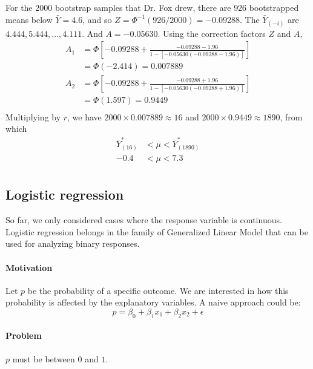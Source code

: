 For the $2000$ bootstrap samples that Dr. Fox drew, there are $926$ bootstrapped means below $\bar{Y} = 4.6$, and so $Z = \Phi^{-1}(926/2000) = -0.09288$.
The $\bar{Y}_{(-i)}$ are $4.444, 5.444, \dots, 4.111$. And $A = -0.05630$.  Using the correction factors $Z$ and $A$,
$$
\begin{aligned}
 		A_1 &= \Phi\left[-0.09288 + \frac{-0.09288 - 1.96}{1 - [-0.05630(-0.09288 - 1.96)]}\right]\\
 		&= \Phi(-2.414) = 0.007889\\
 		A_2 &= \Phi\left[-0.09288 + \frac{-0.09288 + 1.96}{1 - [-0.05630(-0.09288 + 1.96)]}\right]\\
 		&= \Phi(1.597) = 0.9449\\
\end{aligned}
$$
Multiplying by $r$, we have $2000 \times 0.007889 \approx 16$ and $2000 \times 0.9449 \approx 1890$, from which
$$
\begin{aligned}
\bar{Y}_{(16)}^* &< \mu < \bar{Y}_{(1890)}^*\\
-0.4 &< \mu < 7.3\\
\end{aligned}
$$

\subsection*{Logistic regression}
So far, we only considered cases where the response variable is continuous.
Logistic regression belongs in the family of Generalized Linear Model that can be used for analyzing binary responses.

\paragraph{Motivation}
Let $p$ be the probability of a specific outcome.
We are interested in how this probability is affected by the explanatory variables.
A naive approach could be:
$$
p = \beta_0 + \beta_1 x_1 + \beta_2 x_2 + \epsilon
$$
\paragraph{Problem}
$p$ must be between $0$ and $1$.

